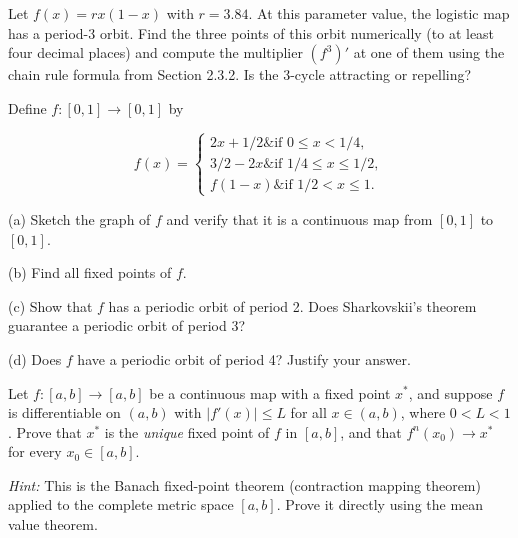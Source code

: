\begin{exercise}
Let $f(x) = rx(1-x)$ with $r = 3.84$. At this parameter value, the logistic map has a period-3 orbit. Find the three points of this orbit numerically (to at least four decimal places) and compute the multiplier $(f^3)'$ at one of them using the chain rule formula from Section 2.3.2. Is the 3-cycle attracting or repelling?
\end{exercise}


\begin{exercise}
Define $f: [0,1] \to [0,1]$ by

\[
f(x) = \begin{cases} 2x + 1/2 \& \text{if } 0 \leq x < 1/4, \\ 3/2 - 2x \& \text{if } 1/4 \leq x \leq 1/2, \\ f(1-x) \& \text{if } 1/2 < x \leq 1. \end{cases}
\]

(a) Sketch the graph of $f$ and verify that it is a continuous map from $[0,1]$ to $[0,1]$.

(b) Find all fixed points of $f$.

(c) Show that $f$ has a periodic orbit of period 2. Does Sharkovskii's theorem guarantee a periodic orbit of period 3?

(d) Does $f$ have a periodic orbit of period 4? Justify your answer.
\end{exercise}


\begin{exercise}
Let $f: [a,b] \to [a,b]$ be a continuous map with a fixed point $x^*$, and suppose $f$ is differentiable on $(a,b)$ with $|f'(x)| \leq L$ for all $x \in (a,b)$, where $0 < L < 1$. Prove that $x^*$ is the \textit{unique} fixed point of $f$ in $[a,b]$, and that $f^n(x_0) \to x^*$ for every $x_0 \in [a,b]$.

\textit{Hint:} This is the Banach fixed-point theorem (contraction mapping theorem) applied to the complete metric space $[a,b]$. Prove it directly using the mean value theorem.
\end{exercise}
